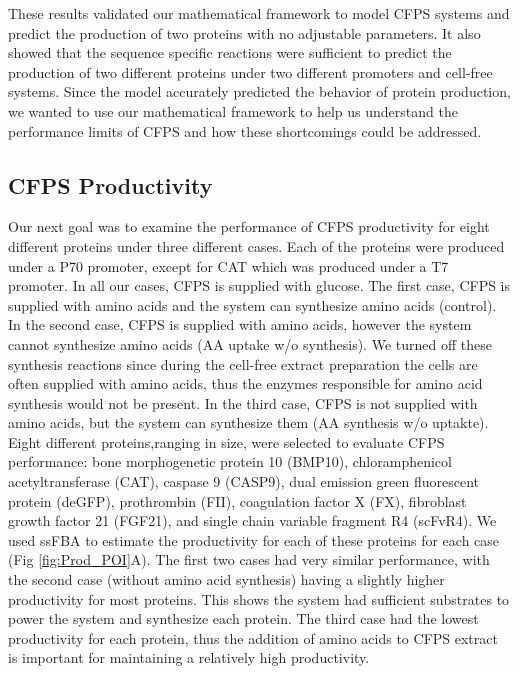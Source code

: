 \documentclass[journal=asbcd6,manuscript=article]{achemso}
\begin{document}
These results validated our mathematical framework to model CFPS systems and predict the production of two proteins with no adjustable parameters.
It also showed that the sequence specific reactions were sufficient to predict the production of two different proteins under two different promoters and cell-free systems.
Since the model accurately predicted the behavior of protein production, we wanted to use our mathematical framework to help us understand the performance limits of CFPS and how these shortcomings could be addressed.

\subsection{CFPS Productivity}
Our next goal was to examine the performance of CFPS productivity for eight different proteins under three different cases. Each of the proteins were produced under a P70 promoter, except for CAT which was produced under a T7 promoter. In all our cases, CFPS is supplied with glucose. The first case, CFPS is supplied with amino acids and the system can synthesize amino acids (control). In the second case, CFPS is supplied with amino acids, however the system cannot synthesize amino acids (AA uptake w/o synthesis). We turned off these synthesis reactions since during the cell-free extract preparation the cells are often supplied with amino acids, thus the enzymes responsible for amino acid synthesis would not be present. In the third case, CFPS is not supplied with amino acids, but the system can synthesize them (AA synthesis w/o uptakte).
Eight different proteins,ranging in size, were selected to evaluate CFPS performance: bone morphogenetic protein 10 (BMP10), chloramphenicol acetyltransferase (CAT), caspase 9 (CASP9), dual emission green fluorescent protein (deGFP), prothrombin (FII), coagulation factor X (FX), fibroblast growth factor 21 (FGF21), and single chain variable fragment R4 (scFvR4).
We used ssFBA to estimate the productivity for each of these proteins for each case (Fig \ref{fig:Prod_POI}A).
The first two cases had very similar performance, with the second case (without amino acid synthesis) having a slightly higher productivity for most proteins. 
This shows the system had sufficient substrates to power the system and synthesize each protein.
The third case had the lowest productivity for each protein, thus the addition of amino acids to CFPS extract is important for maintaining a relatively high productivity.
\end{document}
